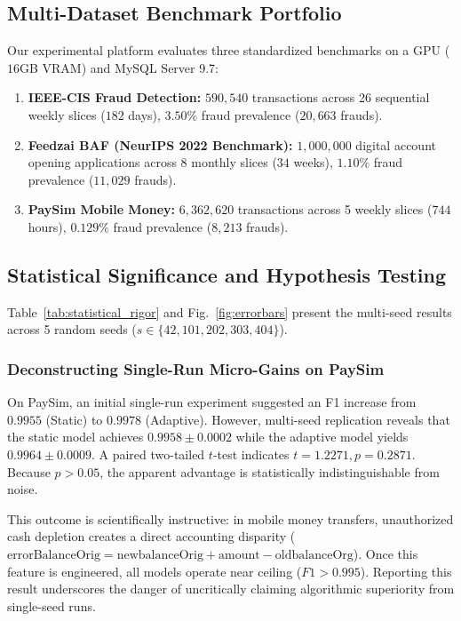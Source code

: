 \documentclass[10pt,conference,compsoc]{IEEEtran}
\begin{document}
\subsection{Multi-Dataset Benchmark Portfolio}
Our experimental platform evaluates three standardized benchmarks on a GPU ($16$GB VRAM) and MySQL Server 9.7:
\begin{enumerate}
    \item \textbf{IEEE-CIS Fraud Detection:} $590{,}540$ transactions across 26 sequential weekly slices ($182$ days), $3.50\%$ fraud prevalence ($20{,}663$ frauds).
    \item \textbf{Feedzai BAF (NeurIPS 2022 Benchmark):} $1{,}000{,}000$ digital account opening applications across 8 monthly slices ($34$ weeks), $1.10\%$ fraud prevalence ($11{,}029$ frauds).
    \item \textbf{PaySim Mobile Money:} $6{,}362{,}620$ transactions across 5 weekly slices ($744$ hours), $0.129\%$ fraud prevalence ($8{,}213$ frauds).
\end{enumerate}

\subsection{Statistical Significance and Hypothesis Testing}
Table~\ref{tab:statistical_rigor} and Fig.~\ref{fig:errorbars} present the multi-seed results across 5 random seeds ($s \in \{42, 101, 202, 303, 404\}$).

\subsubsection{Deconstructing Single-Run Micro-Gains on PaySim}
On PaySim, an initial single-run experiment suggested an F1 increase from $0.9955$ (Static) to $0.9978$ (Adaptive). However, multi-seed replication reveals that the static model achieves $0.9958 \pm 0.0002$ while the adaptive model yields $0.9964 \pm 0.0009$. A paired two-tailed $t$-test indicates $t = 1.2271, p = 0.2871$. Because $p > 0.05$, the apparent advantage is statistically indistinguishable from noise. 

This outcome is scientifically instructive: in mobile money transfers, unauthorized cash depletion creates a direct accounting disparity ($\text{errorBalanceOrig} = \text{newbalanceOrig} + \text{amount} - \text{oldbalanceOrg}$). Once this feature is engineered, all models operate near ceiling ($F1 > 0.995$). Reporting this result underscores the danger of uncritically claiming algorithmic superiority from single-seed runs.
\end{document}
